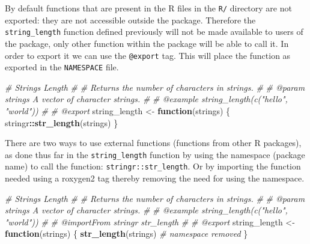 \documentclass[
]{krantz}
\makeatletter
\newenvironment{Shaded}{\begin{snugshade}}{\end{snugshade}}
\newcommand{\CommentTok}[1]{\textcolor[rgb]{0.37,0.37,0.37}{\textit{#1}}}
\newcommand{\ControlFlowTok}[1]{\textcolor[rgb]{0.27,0.27,0.27}{\textbf{#1}}}
\newcommand{\KeywordTok}[1]{\textcolor[rgb]{0.27,0.27,0.27}{\textbf{#1}}}
\newcommand{\NormalTok}[1]{#1}
\newcommand{\OperatorTok}[1]{\textcolor[rgb]{0.43,0.43,0.43}{\textbf{#1}}}
\newcommand{\StringTok}[1]{\textcolor[rgb]{0.5,0.5,0.5}{#1}}
\newenvironment{kframe}{%
\medskip{}
\setlength{\fboxsep}{.8em}
 \def\at@end@of@kframe{}%
 \ifinner\ifhmode%
  \def\at@end@of@kframe{\end{minipage}}%
  \begin{minipage}{\columnwidth}%
 \fi\fi%
 \def\FrameCommand##1{\hskip\@totalleftmargin \hskip-\fboxsep
 \colorbox{shadecolor}{##1}\hskip-\fboxsep
     \hskip-\linewidth \hskip-\@totalleftmargin \hskip\columnwidth}%
 \MakeFramed {\advance\hsize-\width
   \@totalleftmargin\z@ \linewidth\hsize
   \@setminipage}}%
 {\par\unskip\endMakeFramed%
 \at@end@of@kframe}
\renewenvironment{Shaded}{\begin{kframe}}{\end{kframe}}
\makeatother
\begin{document}
By default functions that are present in the R files in the \texttt{R/} directory are not exported: they are not accessible outside the package. Therefore the \texttt{string\_length} function defined previously will not be made available to users of the package, only other function within the package will be able to call it. In order to export it we can use the \texttt{@export} tag. This will place the function as exported in the \texttt{NAMESPACE} file.

\begin{Shaded}
\begin{Highlighting}[]
\CommentTok{\#\textquotesingle{} Strings Length}
\CommentTok{\#\textquotesingle{} }
\CommentTok{\#\textquotesingle{} Returns the number of characters in strings. }
\CommentTok{\#\textquotesingle{} }
\CommentTok{\#\textquotesingle{} @param strings A vector of character strings.}
\CommentTok{\#\textquotesingle{} }
\CommentTok{\#\textquotesingle{} @example string\_length(c("hello", "world"))}
\CommentTok{\#\textquotesingle{} }
\CommentTok{\#\textquotesingle{} @export}
\NormalTok{string\_length <{-}}\StringTok{ }\ControlFlowTok{function}\NormalTok{(strings) \{}
\NormalTok{  stringr}\OperatorTok{::}\KeywordTok{str\_length}\NormalTok{(strings)}
\NormalTok{\}}
\end{Highlighting}
\end{Shaded}

There are two ways to use external functions (functions from other R packages), as done thus far in the \texttt{string\_length} function by using the namespace (package name) to call the function: \texttt{stringr::str\_length}. Or by importing the function needed using a roxygen2 tag thereby removing the need for using the namespace.

\begin{Shaded}
\begin{Highlighting}[]
\CommentTok{\#\textquotesingle{} Strings Length}
\CommentTok{\#\textquotesingle{} }
\CommentTok{\#\textquotesingle{} Returns the number of characters in strings. }
\CommentTok{\#\textquotesingle{} }
\CommentTok{\#\textquotesingle{} @param strings A vector of character strings.}
\CommentTok{\#\textquotesingle{} }
\CommentTok{\#\textquotesingle{} @example string\_length(c("hello", "world"))}
\CommentTok{\#\textquotesingle{} }
\CommentTok{\#\textquotesingle{} @importFrom stringr str\_length}
\CommentTok{\#\textquotesingle{} }
\CommentTok{\#\textquotesingle{} @export}
\NormalTok{string\_length <{-}}\StringTok{ }\ControlFlowTok{function}\NormalTok{(strings) \{}
  \KeywordTok{str\_length}\NormalTok{(strings) }\CommentTok{\# namespace removed}
\NormalTok{\}}
\end{Highlighting}
\end{Shaded}
\end{document}
